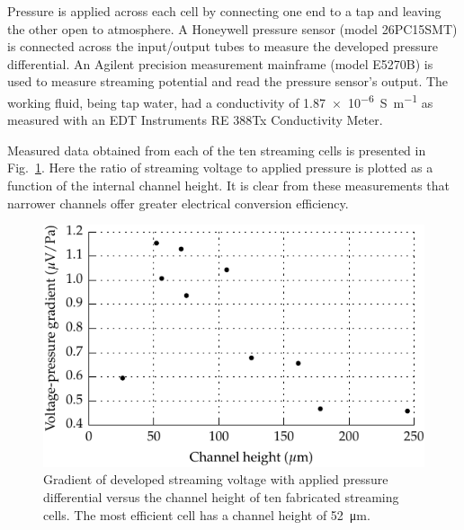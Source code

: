 \documentclass[10pt,final,journal]{IEEEtran}
\begin{document}
    Pressure is applied across each cell by connecting one end to a tap and leaving the other open to atmosphere.
    A Honeywell pressure sensor (model 26PC15SMT) is connected across the input/output tubes to measure the developed pressure differential.
    An Agilent precision measurement mainframe (model E5270B) is used to measure streaming potential and read the pressure sensor's output.
    The working fluid, being tap water, had a conductivity of \SI{1.87e-6}{\siemens\per\meter} as measured with an EDT Instruments RE 388Tx Conductivity Meter.

    Measured data obtained from each of the ten streaming cells is presented in Fig.~\ref{fig:cellEfficiency}.
    Here the ratio of streaming voltage to applied pressure is plotted as a function of the internal channel height.
    It is clear from these measurements that narrower channels offer greater electrical conversion efficiency.

    \begin{figure}
        \begin{center}
        \includegraphics[width=\linewidth]{graph_cellEfficiency}
        \end{center}
        \caption{Gradient of developed streaming voltage with applied pressure differential versus the channel height of ten fabricated streaming cells.
        The most efficient cell has a channel height of \SI{52}{\micro\meter}.}
        \label{fig:cellEfficiency}
    \end{figure}
\end{document}
